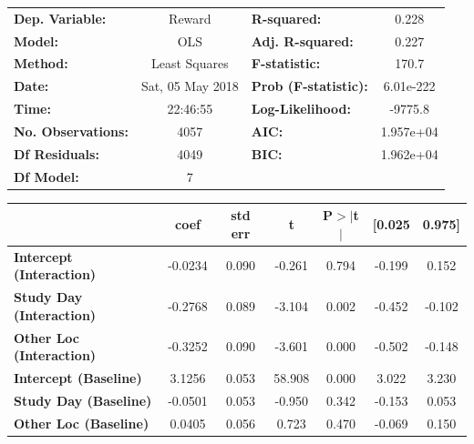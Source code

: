 \begin{table}
\begin{tabular}{lclc}
\toprule
\textbf{Dep. Variable:}                &      Reward       & \textbf{  R-squared:         } &     0.228   \\
\textbf{Model:}                        &       OLS        & \textbf{  Adj. R-squared:    } &     0.227   \\
\textbf{Method:}                       &  Least Squares   & \textbf{  F-statistic:       } &     170.7   \\
\textbf{Date:}                         & Sat, 05 May 2018 & \textbf{  Prob (F-statistic):} & 6.01e-222   \\
\textbf{Time:}                         &     22:46:55     & \textbf{  Log-Likelihood:    } &   -9775.8   \\
\textbf{No. Observations:}             &        4057      & \textbf{  AIC:               } & 1.957e+04   \\
\textbf{Df Residuals:}                 &        4049      & \textbf{  BIC:               } & 1.962e+04   \\
\textbf{Df Model:}                     &           7      & \textbf{                     } &             \\
\bottomrule
\end{tabular}
\begin{tabular}{lcccccc}
                                       & \textbf{coef} & \textbf{std err} & \textbf{t} & \textbf{P$>$$|$t$|$} & \textbf{[0.025} & \textbf{0.975]}  \\
\midrule
\textbf{Intercept (Interaction)}       &      -0.0234  &        0.090     &    -0.261  &         0.794        &       -0.199    &        0.152     \\
\textbf{Study Day (Interaction)}       &      -0.2768  &        0.089     &    -3.104  &         0.002        &       -0.452    &       -0.102     \\
\textbf{Other Loc (Interaction)}       &      -0.3252  &        0.090     &    -3.601  &         0.000        &       -0.502    &       -0.148     \\
\textbf{Intercept (Baseline)}          &       3.1256  &        0.053     &    58.908  &         0.000        &        3.022    &        3.230     \\
\textbf{Study Day (Baseline)}          &      -0.0501  &        0.053     &    -0.950  &         0.342        &       -0.153    &        0.053     \\
\textbf{Other Loc (Baseline)}          &       0.0405  &        0.056     &     0.723  &         0.470        &       -0.069    &        0.150     \\

\end{tabular}
\end{table}
